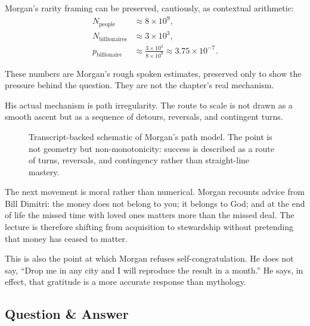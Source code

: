 Morgan's rarity framing can be preserved, cautiously, as contextual arithmetic:
\begin{align}
N_{\mathrm{people}} &\approx 8\times 10^9,\\
N_{\mathrm{billionaires}} &\approx 3\times 10^3,\\
p_{\mathrm{billionaire}}
&\approx
\frac{3\times 10^3}{8\times 10^9}
\approx 3.75\times 10^{-7}.
\end{align}

\begin{remark}
These numbers are Morgan's rough spoken estimates, preserved only to show the pressure behind the question. They are not the chapter's real mechanism.
\end{remark}

His actual mechanism is path irregularity. The route to scale is not drawn as a smooth ascent but as a sequence of detours, reversals, and contingent turns.

\begin{figure}[h]
\centering
{}
\caption{Transcript-backed schematic of Morgan's path model. The point is not geometry but non-monotonicity: success is described as a route of turns, reversals, and contingency rather than straight-line mastery.}
\end{figure}

The next movement is moral rather than numerical. Morgan recounts advice from Bill Dimitri: the money does not belong to you; it belongs to God; and at the end of life the missed time with loved ones matters more than the missed deal. The lecture is therefore shifting from acquisition to stewardship without pretending that money has ceased to matter.

This is also the point at which Morgan refuses self-congratulation. He does not say, ``Drop me in any city and I will reproduce the result in a month.'' He says, in effect, that gratitude is a more accurate response than mythology.

\subsection{Question \& Answer}

